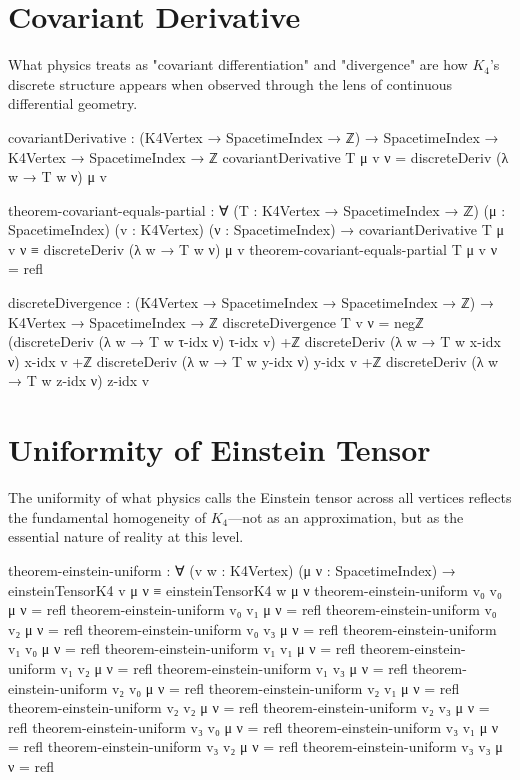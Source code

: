 \documentclass[11pt,a4paper]{book}
\begin{document}
\section{Covariant Derivative}

What physics treats as "covariant differentiation" and "divergence" are how $K_4$'s discrete structure appears when observed through the lens of continuous differential geometry.

\begin{code}
covariantDerivative : (K4Vertex → SpacetimeIndex → ℤ) → 
                       SpacetimeIndex → K4Vertex → SpacetimeIndex → ℤ
covariantDerivative T μ v ν = 
  discreteDeriv (λ w → T w ν) μ v

theorem-covariant-equals-partial : ∀ (T : K4Vertex → SpacetimeIndex → ℤ)
                                     (μ : SpacetimeIndex) (v : K4Vertex) (ν : SpacetimeIndex) →
  covariantDerivative T μ v ν ≡ discreteDeriv (λ w → T w ν) μ v
theorem-covariant-equals-partial T μ v ν = refl

discreteDivergence : (K4Vertex → SpacetimeIndex → SpacetimeIndex → ℤ) → 
                      K4Vertex → SpacetimeIndex → ℤ
discreteDivergence T v ν = 
  negℤ (discreteDeriv (λ w → T w τ-idx ν) τ-idx v) +ℤ
  discreteDeriv (λ w → T w x-idx ν) x-idx v +ℤ
  discreteDeriv (λ w → T w y-idx ν) y-idx v +ℤ
  discreteDeriv (λ w → T w z-idx ν) z-idx v
\end{code}

\section{Uniformity of Einstein Tensor}

The uniformity of what physics calls the Einstein tensor across all vertices reflects the fundamental homogeneity of $K_4$—not as an approximation, but as the essential nature of reality at this level.

\begin{code}
theorem-einstein-uniform : ∀ (v w : K4Vertex) (μ ν : SpacetimeIndex) →
  einsteinTensorK4 v μ ν ≡ einsteinTensorK4 w μ ν
theorem-einstein-uniform v₀ v₀ μ ν = refl
theorem-einstein-uniform v₀ v₁ μ ν = refl
theorem-einstein-uniform v₀ v₂ μ ν = refl
theorem-einstein-uniform v₀ v₃ μ ν = refl
theorem-einstein-uniform v₁ v₀ μ ν = refl
theorem-einstein-uniform v₁ v₁ μ ν = refl
theorem-einstein-uniform v₁ v₂ μ ν = refl
theorem-einstein-uniform v₁ v₃ μ ν = refl
theorem-einstein-uniform v₂ v₀ μ ν = refl
theorem-einstein-uniform v₂ v₁ μ ν = refl
theorem-einstein-uniform v₂ v₂ μ ν = refl
theorem-einstein-uniform v₂ v₃ μ ν = refl
theorem-einstein-uniform v₃ v₀ μ ν = refl
theorem-einstein-uniform v₃ v₁ μ ν = refl
theorem-einstein-uniform v₃ v₂ μ ν = refl
theorem-einstein-uniform v₃ v₃ μ ν = refl
\end{code}
\end{document}
